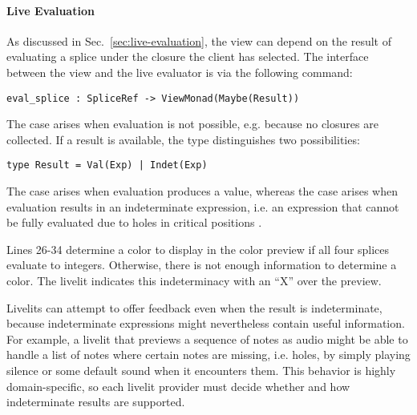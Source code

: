 \paragraph{Live Evaluation}
\label{sec:live-evaluation-def}
As discussed in Sec.~\ref{sec:live-evaluation}, 
the view can depend on the result of evaluating a splice 
under the closure the client has selected.
The interface between the view and the live evaluator 
is via the 
following command:
\begin{lstlisting}[numbers=none,xleftmargin=0cm]
eval_splice : SpliceRef -> ViewMonad(Maybe(Result))
\end{lstlisting}


The  case 
arises when evaluation is not possible, e.g. because no closures are collected.
If a result is available, the  type distinguishes two possibilities:
\begin{lstlisting}[numbers=none]
type Result = Val(Exp) | Indet(Exp)
\end{lstlisting}
The  case arises when evaluation produces a value, whereas the 
 case arises when evaluation results in an indeterminate expression,
i.e. an expression that cannot be fully evaluated due to holes 
in critical positions \cite{HazelnutLive}.

Lines 26-34 determine a color to display in the color preview 
if all four splices evaluate to integers. Otherwise, there is not 
enough information to determine a color. The livelit 
indicates this indeterminacy with an ``X'' over the preview.

Livelits can attempt to offer feedback even when the result is indeterminate,
because indeterminate expressions might nevertheless contain useful information.
For example, a livelit that previews a sequence of notes as audio might be able 
to handle a list of notes where certain notes are missing, i.e. holes, by 
simply playing silence or some default sound when it encounters them.
This behavior is highly domain-specific, so each livelit provider must decide 
whether and how indeterminate results are supported.

